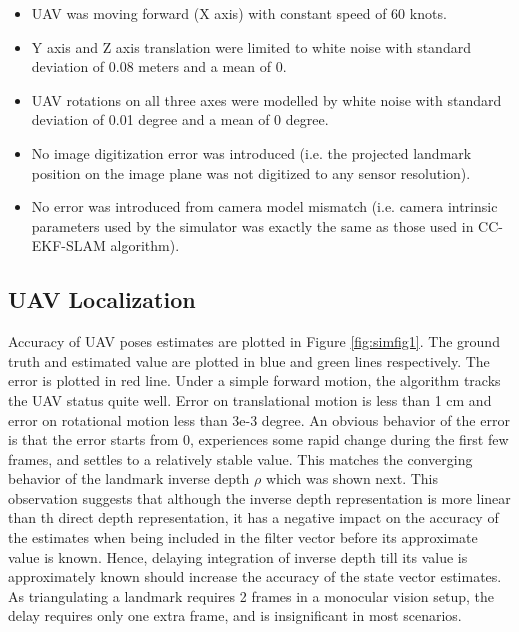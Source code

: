 \begin{itemize}
  \item UAV was moving forward (X axis) with constant speed of 60 knots. 
  \item Y axis and Z axis translation were limited to white noise with
  standard deviation of 0.08 meters and a mean of 0.
  \item UAV rotations on all three axes were modelled by white noise with standard
  deviation of 0.01 degree and a mean of 0 degree.
  \item No image digitization error was introduced (i.e. the projected
  landmark position on the image plane was not digitized to any sensor
  resolution).
  \item No error was introduced from camera model mismatch (i.e.
  camera intrinsic parameters used by the simulator was exactly the
  same as those used in CC-EKF-SLAM algorithm).
\end{itemize}

\subsection{UAV Localization}
Accuracy of UAV poses estimates are plotted in Figure
\ref{fig:simfig1}. The ground truth and estimated value are plotted
in blue and green lines respectively. The error is plotted in red
line. Under a simple forward motion, the algorithm tracks the
UAV status quite well. Error on translational motion is less than 1
cm and error on rotational motion less than 3e-3 degree. An obvious
behavior of the error is that the error starts from 0, experiences
some rapid change during the first few frames, and settles to a
relatively stable value. This matches the converging behavior of the
landmark inverse depth $\rho$ which was shown next. This observation
suggests that although the inverse depth representation is more linear
than th direct depth representation, it has a negative impact on the
accuracy of the estimates when being included in the filter vector
before its approximate value is known. Hence, delaying integration of
inverse depth till its value is approximately known should increase
the accuracy of the state vector estimates. As triangulating a
landmark requires 2 frames in a monocular vision setup, the delay
requires only one extra frame, and is insignificant in most scenarios.

